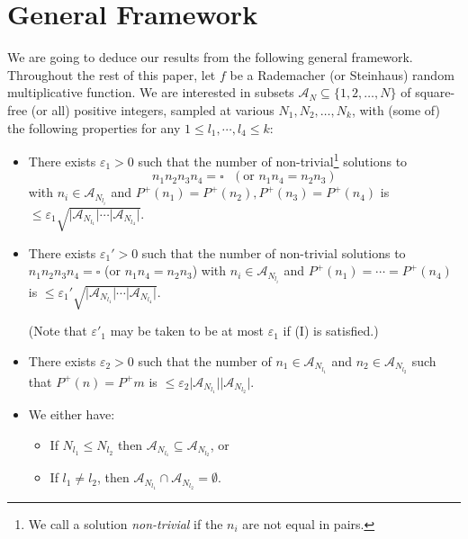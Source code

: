 \documentclass[11pt]{tran-l}
\theoremstyle{definition}
\theoremstyle{remark}
\numberwithin{equation}{section}
\begin{document}
\section{General Framework}\label{section:generalSetup}
We are going to deduce our results from the following general framework. Throughout the rest of this paper, let $f$ be a Rademacher (or Steinhaus) random multiplicative function. We are interested in subsets $\mathcal A_N\subseteq\{1, 2, \ldots, N\}$ of square-free (or all) positive integers, sampled at various $N_1, N_2, \ldots, N_k$, with (some of) the following properties for any $1\leq l_1, \cdots , l_4\leq k$:
\begin{itemize}
    \item[(I)] There exists $\varepsilon_1>0$ such that the number of non-trivial\footnote{We call a solution \emph{non-trivial} if the $n_i$ are not equal in pairs.} solutions to $$n_1n_2n_3n_4=\square \text{ }(\text{or }n_1n_4=n_2n_3)$$ 
    with $n_i\in\mathcal A_{N_{l_i}}$ and $P^+(n_1)=P^+(n_2), P^+(n_3)=P^+(n_4)$ is $\leq \varepsilon_1\sqrt{\lvert\mathcal A_{N_{l_1}}\rvert\cdots \lvert\mathcal A_{N_{l_4}}\rvert}$.
     \item[(I')] There exists $\varepsilon_1'>0$ such that the number of non-trivial solutions to $n_1n_2n_3n_4=\square$ 
     (or $n_1n_4=n_2n_3$) 
    with $n_i\in\mathcal A_{N_{l_i}}$ and $P^+(n_1) = \cdots = P^+(n_4)$ is $\leq \varepsilon_1'\sqrt{\lvert\mathcal A_{N_{l_1}}\rvert\cdots \lvert\mathcal A_{N_{l_4}}\rvert}$. 
    
    (Note that $\varepsilon'_1$ may be taken to be at most $\varepsilon_1$ if (I) is satisfied.)
    
  
    
    \item[(II)] There exists $\varepsilon_2>0$ such that the number of $n_1\in\mathcal A_{N_{l_1}}$ and $n_2\in\mathcal A_{N_{l_2}}$ such that $P^+(n)=P^+m$ is $\leq \varepsilon_2\lvert\mathcal A_{N_{l_1}}\rvert\lvert\mathcal A_{N_{l_2}}\rvert$.


    \item[(III)] We either have: 
    \begin{itemize}
        \item[(III$_a$)] If $N_{l_1}\leq N_{l_2}$ then $\mathcal A_{N_{l_1}}\subseteq \mathcal A_{N_{l_2}}$, or
        \item[(III$_b$)] If $l_1\neq l_2$, then $\mathcal A_{N_{l_1}}\cap\mathcal A_{N_{l_2}} =\emptyset$. 
    \end{itemize} 

\end{itemize}
\end{document}
